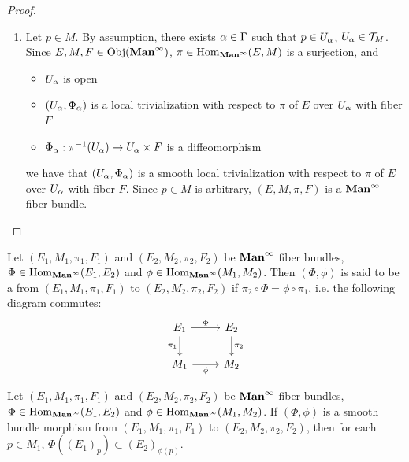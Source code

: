 \documentclass{book}
\begin{document}
\begin{proof}
\begin{enumerate}
\begin{itemize}
			\end{itemize}
			we have that $\pi|_{V^E_{\al, \mu, \nu}}: V^E_{\al, \mu, \nu} \rightarrow V^M_{\al, \mu}$ is smooth. Since $(\al, \mu, \nu) \in \Pi^E$ is arbitrary and $(V^E_{\al, \mu, \nu})_{(\al, \mu, \nu) \in \Pi^E }$ is an open cover of $E$, we have that $\pi:E \rightarrow M$ is smooth.
			\item Let $p \in M$. By assumption, there exists $\alpha \in \Gamma$ such that $p \in U_{\alpha}$, $U_{\alpha} \in \mathcal{T}_M$. Since $E,M,F \in \operatorname{Obj}(\operatorname*{\text{\textbf{Man}}^{\infty}})$, $\pi \in \operatorname{Hom}_{\operatorname*{\text{\textbf{Man}}^{\infty}}}(E,M)$ is a surjection, and 
			\begin{itemize}
				\item $U_{\alpha}$ is open
				\item $(U_{\alpha}, \Phi_{\alpha})$ is a local trivialization with respect to $\pi$ of $E$ over $U_{\alpha}$ with fiber $F$
				\item $\Phi_{\alpha}: \pi^{-1}(U_{\alpha}) \rightarrow U_{\alpha} \times F$ is a diffeomorphism
			\end{itemize}
			we have that $(U_{\alpha}, \Phi_{\alpha})$ is a smooth local trivialization with respect to $\pi$ of $E$ over $U_{\alpha}$ with fiber $F$. Since $p \in M$ is arbitrary, $(E, M, \pi, F)$ is a $\operatorname*{\text{\textbf{Man}}^{\infty}}$ fiber bundle.  
		\end{enumerate}
	\end{proof}

	\begin{defn} 
		Let $(E_1, M_1, \pi_1, F_1)$ and $(E_2, M_2, \pi_2, F_2)$ be $\operatorname*{\text{\textbf{Man}}^{\infty}}$ fiber bundles, $\Phi \in \operatorname{Hom}_{\operatorname*{\text{\textbf{Man}}^{\infty}}}(E_1, E_2)$ and $\phi \in \operatorname{Hom}_{\operatorname*{\text{\textbf{Man}}^{\infty}}}(M_1, M_2)$. Then $(\Phi, \phi)$ is said to be a  from $(E_1, M_1, \pi_1, F_1)$ to $(E_2, M_2, \pi_2, F_2)$ if 
		$\pi_2 \circ \Phi = \phi \circ \pi_1$, 
		i.e. the following diagram commutes:
		\[ 
		\begin{tikzcd}
			E_1 \arrow[r, "\Phi"] \arrow[d, "\pi_1"'] & E_2  \arrow[d, "\pi_2"] \\
			M_1 \arrow[r, "\phi"']                  & M_2
		\end{tikzcd}
		\] 
	\end{defn}

	\begin{ex}
		Let $(E_1, M_1, \pi_1, F_1)$ and $(E_2, M_2, \pi_2, F_2)$ be $\operatorname*{\text{\textbf{Man}}^{\infty}}$ fiber bundles, $\Phi \in \operatorname{Hom}_{\operatorname*{\text{\textbf{Man}}^{\infty}}}(E_1, E_2)$ and $\phi \in \operatorname{Hom}_{\operatorname*{\text{\textbf{Man}}^{\infty}}}(M_1, M_2)$. If $(\Phi, \phi)$ is a smooth bundle morphism from $(E_1, M_1, \pi_1, F_1)$ to $(E_2, M_2, \pi_2, F_2)$, then for each $p \in M_1$, $\Phi({(E_1)_p}) \subset (E_2)_{\phi(p)}$.
	\end{ex}
\end{document}
